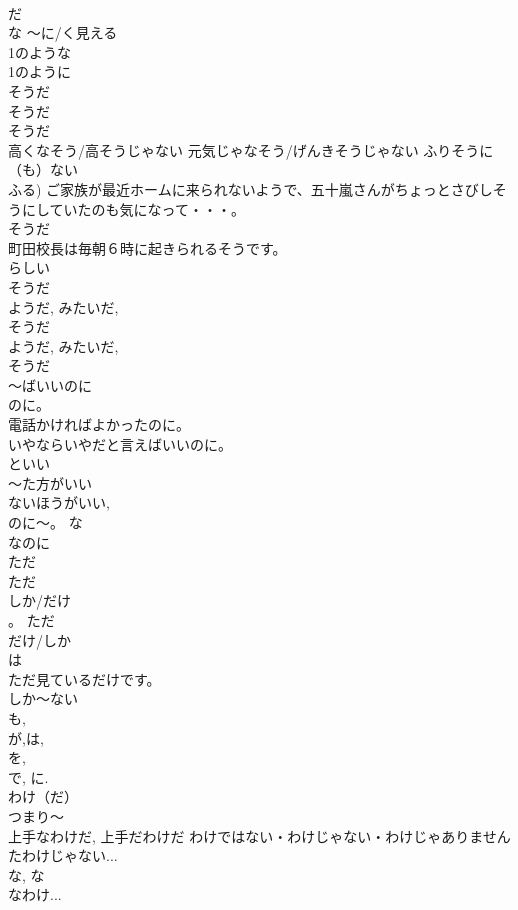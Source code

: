 \documentclass[8pt]{extreport}
\begin{document}
\begin{CJK}{UTF8}{min}
\\	だ 
\\	な ～に/く見える 
\\	1のような
\\	1のように
\\	そうだ 
\\	そうだ 
\\	そうだ 
\\	高くなそう/高そうじゃない 元気じゃなそう/げんきそうじゃない ふりそうに（も）ない　
\\	ふる) ご家族が最近ホームに来られないようで、五十嵐さんがちょっとさびしそうにしていたのも気になって・・・。 
\\	そうだ 
\\	町田校長は毎朝６時に起きられるそうです。 
\\	らしい 
\\	そうだ 
\\	ようだ, みたいだ, 
\\	そうだ 
\\	ようだ, みたいだ, 
\\	そうだ 
\\	～ばいいのに	
\\	のに。 
\\	電話かければよかったのに。 
\\	いやならいやだと言えばいいのに。 
\\	といい 
\\	～た方がいい 
\\	ないほうがいい, 
\\	のに～。 な
\\	なのに
\\	ただ	
\\	ただ
\\	しか/だけ
\\	。 ただ
\\	だけ/しか
\\	は
\\	ただ見ているだけです。 
\\	しか～ない 
\\	も, 
\\	が,は, 
\\	を, 
\\	で, に.
\\	わけ（だ）	
\\	つまり～　
\\	上手なわけだ, 上手だわけだ わけではない・わけじゃない・わけじゃありません 
\\	たわけじゃない... 
\\	な, な
\\	なわけ... 

\end{CJK}
\end{document}
